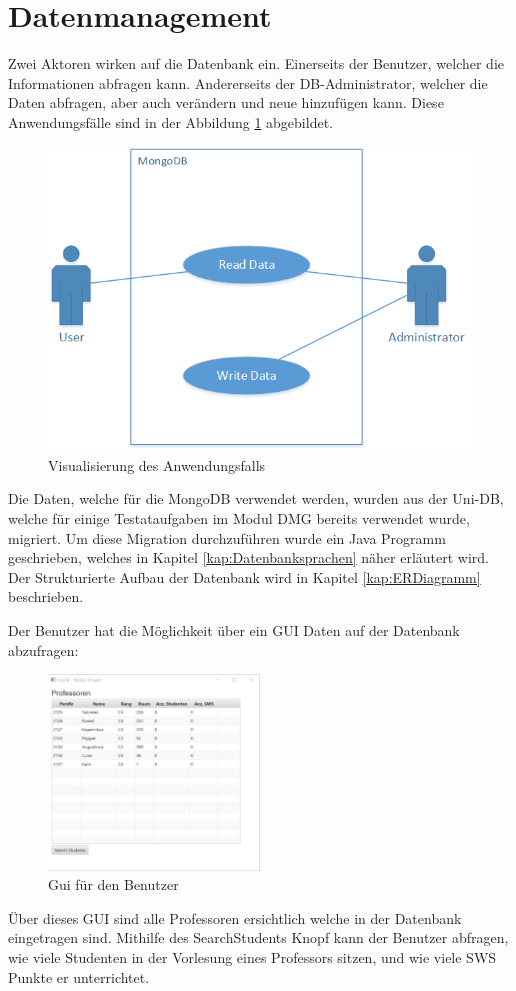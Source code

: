 \section{Datenmanagement}
Zwei Aktoren wirken auf die Datenbank ein. Einerseits der Benutzer, welcher die
Informationen abfragen kann. Andererseits der DB-Administrator, welcher die
Daten abfragen, aber auch verändern und neue hinzufügen kann. Diese
Anwendungsfälle sind in der Abbildung \ref{fig:usecase} abgebildet.

\begin{figure}[h]
  \centering
     \includegraphics[width=1\textwidth]{./pictures/UseCase.png}
  \caption{Visualisierung des Anwendungsfalls}
  \label{fig:usecase}
\end{figure}

Die Daten, welche für die MongoDB verwendet werden, wurden aus der Uni-DB, welche für einige Testataufgaben im Modul DMG bereits verwendet wurde, migriert. Um diese Migration durchzuführen wurde ein Java Programm geschrieben, welches in Kapitel \ref{kap:Datenbanksprachen} näher erläutert wird. Der Strukturierte Aufbau der Datenbank wird in Kapitel \ref{kap:ERDiagramm} beschrieben.

\newpage
Der Benutzer hat die Möglichkeit über ein GUI Daten auf der Datenbank abzufragen:
\begin{figure}[h]
	\centering
	\includegraphics[width=0.5\textwidth]{./pictures/UniDBView.png}
	\caption{Gui für den Benutzer}
	\label{fig:GUI1}
\end{figure}

Über dieses GUI sind alle Professoren ersichtlich welche in der Datenbank eingetragen sind.
Mithilfe des SearchStudents Knopf kann der Benutzer abfragen, wie viele Studenten in der Vorlesung eines Professors sitzen, und wie viele SWS Punkte er unterrichtet.